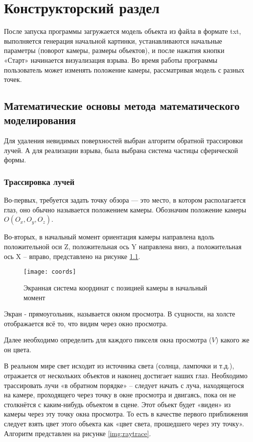 \chapter{\textbf{Конструкторский раздел}}

\hfill

После запуска программы загружается модель объекта из файла в формате txt, выполняется генерация начальной картинки, устанавливаются начальные параметры (поворот камеры, размеры объектов), и после нажатия кнопки «Старт» начинается визуализация взрыва. Во время работы программы пользователь может изменять положение камеры, рассматривая модель с разных точек. 

\section{\textbf{Математические основы метода математического моделирования}}

\hfill

Для удаления невидимых поверхностей выбран алгоритм обратной трассировки лучей. А для реализации взрыва, была выбрана система частицы сферической формы. 

\subsection{\textbf{Трассировка лучей}}

\hfill

Во-первых, требуется задать точку обзора — это место, в котором располагается глаз, оно обычно называется положением камеры. Обозначим положение камеры $O(O_x, O_y, O_z)$. 

Во-вторых, в начальный момент ориентация камеры направлена вдоль положительной оси Z, положительная ось Y направлена вниз, а положительная ось X -- вправо, представлено на рисунке \ref{img:coords}. 

\begin{figure}[H]
	\centering
	\texttt{[image: coords]}
	\caption{Экранная система координат с позицией камеры в начальный момент}
	\label{img:coords}
\end{figure}

Экран - прямоугольник, называется окном просмотра. В сущности, на холсте отображается всё то, что видим через окно просмотра.

Далее необходимо определить для каждого пикселя окна просмотра ($V$) какого же он цвета.

В реальном мире свет исходит из источника света (солнца, лампочки и т.д.), отражается от нескольких объектов и наконец достигает наших глаз. Необходимо трассировать лучи «в обратном порядке» -- следует начать с луча, находящегося на камере, проходящего через точку в окне просмотра и двигаясь, пока он не столкнётся с каким-нибудь объектом в сцене. Этот объект будет «виден» из камеры через эту точку окна просмотра. То есть в качестве первого приближения следует взять цвет этого объекта как «цвет света, прошедшего через эту точку».
Алгоритм представлен на рисунке \ref{img:raytrace}. 

